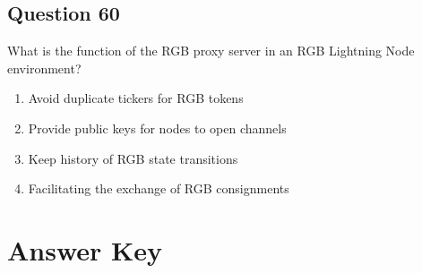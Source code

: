 \documentclass[12pt,a4paper]{article}
\begin{document}
\bigskip


\subsection*{Question 60}
What is the function of the RGB proxy server in an RGB Lightning Node environment?

\begin{enumerate}[label=\Alph*., leftmargin=*]
\item Avoid duplicate tickers for RGB tokens
\item Provide public keys for nodes to open channels
\item Keep history of RGB state transitions
\item Facilitating the exchange of RGB consignments
\end{enumerate}

\bigskip


\newpage
\section*{Answer Key}
\end{document}
